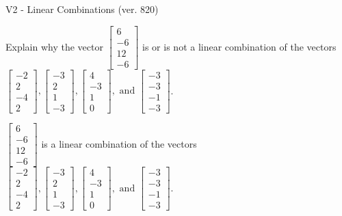 \begin{exercise}
  \begin{exerciseTitle}V2 - Linear Combinations (ver. 820)\end{exerciseTitle}
  \begin{exerciseStatement}
    Explain why the vector \(\left[\begin{array}{c}
6 \\
-6 \\
12 \\
-6
\end{array}\right]\)  is or is not a linear 
	combination of the vectors \(\left[\begin{array}{c}
-2 \\
2 \\
-4 \\
2
\end{array}\right] , \left[\begin{array}{c}
-3 \\
2 \\
1 \\
-3
\end{array}\right] , \left[\begin{array}{c}
4 \\
-3 \\
1 \\
0
\end{array}\right] , \text{ and } \left[\begin{array}{c}
-3 \\
-3 \\
-1 \\
-3
\end{array}\right]\).
	


  \end{exerciseStatement}
  \begin{exerciseAnswer}
   \(\left[\begin{array}{c}
6 \\
-6 \\
12 \\
-6
\end{array}\right]\) 
  	 is  
	a linear combination of the vectors \(\left[\begin{array}{c}
-2 \\
2 \\
-4 \\
2
\end{array}\right] , \left[\begin{array}{c}
-3 \\
2 \\
1 \\
-3
\end{array}\right] , \left[\begin{array}{c}
4 \\
-3 \\
1 \\
0
\end{array}\right] , \text{ and } \left[\begin{array}{c}
-3 \\
-3 \\
-1 \\
-3
\end{array}\right]\).


\end{exerciseAnswer}
\end{exercise}
